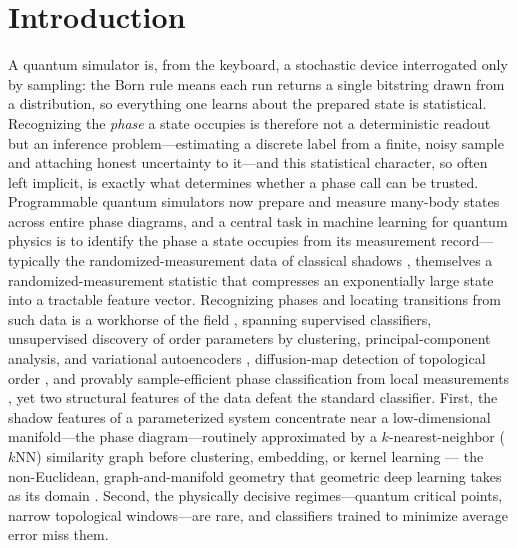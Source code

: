 \documentclass[aps,prresearch,reprint,amsmath,amssymb,nofootinbib,superscriptaddress,floatfix]{revtex4-2}
\theoremstyle{definition}
\theoremstyle{remark}
\theoremstyle{plain}
\begin{document}
\section{Introduction}
\label{sec:intro}
A quantum simulator is, from the keyboard, a stochastic device interrogated only by sampling: the Born rule
means each run returns a single bitstring drawn from a distribution, so everything one learns about the
prepared state is statistical. Recognizing the \emph{phase} a state occupies is therefore not a
deterministic readout but an inference problem---estimating a discrete label from a finite, noisy sample and
attaching honest uncertainty to it---and this statistical character, so often left implicit, is exactly what
determines whether a phase call can be trusted. Programmable quantum simulators now prepare and measure
many-body states across entire phase diagrams, and a central task in machine learning for quantum physics is
to identify the phase a state occupies from its measurement record---typically the randomized-measurement
data of classical shadows \cite{huang2020shadows,elben2023randomized}, themselves a randomized-measurement
statistic that compresses an exponentially large state into a tractable feature vector. Recognizing phases and locating transitions from such data is a workhorse of the
field \cite{carrasquilla2017ml,vannieuwenburg2017confusion,carleo2019rmp,biamonte2017qml,carrasquilla2020review},
spanning supervised classifiers, unsupervised discovery of order parameters by
clustering, principal-component analysis, and variational autoencoders
\cite{wang2016discovering,wetzel2017unsupervised}, diffusion-map detection of
topological order \cite{rodriguez2019topological}, and provably sample-efficient
phase classification from local measurements \cite{huang2022provable}, yet two
structural features of the data defeat the standard classifier. First, the shadow features of a
parameterized system concentrate near a low-dimensional manifold---the phase diagram---routinely
approximated by a $k$-nearest-neighbor ($k$NN) similarity graph before clustering, embedding, or kernel
learning
\cite{coifman2006diffusion,belkin2003laplacian,luxburg2007spectral,vandermaaten2008tsne,havlicek2019,schuld2019}---%
the non-Euclidean, graph-and-manifold geometry that geometric deep learning takes as its
domain \cite{bronstein2017geometric}.
Second, the physically decisive regimes---quantum critical points, narrow topological windows---are rare,
and classifiers trained to minimize average error miss them.
\end{document}
